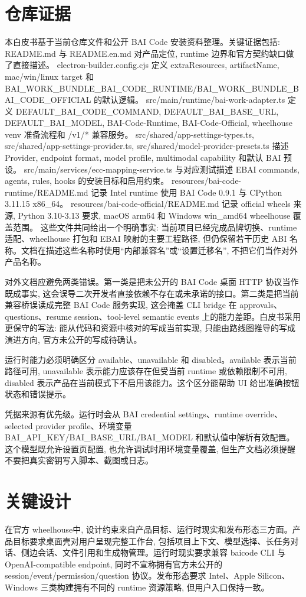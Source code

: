 \section{仓库证据}
本白皮书基于当前仓库文件和公开 BAI Code 安装资料整理。关键证据包括: README.md 与 README.en.md 对产品定位, runtime 边界和官方契约缺口做了直接描述。 electron-builder.config.cjs 定义 extraResources, artifactName, mac/win/linux target 和 BAI\_WORK\_BUNDLE\_BAI\_CODE\_RUNTIME/BAI\_WORK\_BUNDLE\_BAI\_CODE\_OFFICIAL 的默认逻辑。 src/main/runtime/bai-work-adapter.ts 定义 DEFAULT\_BAI\_CODE\_COMMAND, DEFAULT\_BAI\_BASE\_URL, DEFAULT\_BAI\_MODEL, BAI-Code-Runtime, BAI-Code-Official, wheelhouse venv 准备流程和 /v1/* 兼容服务。 src/shared/app-settings-types.ts, src/shared/app-settings-provider.ts, src/shared/model-provider-presets.ts 描述 Provider, endpoint format, model profile, multimodal capability 和默认 BAI 预设。 src/main/services/ecc-mapping-service.ts 与对应测试描述 EBAI commands, agents, rules, hooks 的安装目标和启用约束。 resources/bai-code-runtime/README.md 记录 Intel runtime 使用 BAI Code 0.9.1 与 CPython 3.11.15 x86\_64。 resources/bai-code-official/README.md 记录 official wheels 来源, Python 3.10-3.13 要求, macOS arm64 和 Windows win\_amd64 wheelhouse 覆盖范围。 这些文件共同给出一个明确事实: 当前项目已经完成品牌切换、runtime 适配、wheelhouse 打包和 EBAI 映射的主要工程路径, 但仍保留若干历史 ABI 名称。文档在描述这些名称时使用“内部兼容名”或“设置迁移名”, 不把它们当作对外产品名称。

对外文档应避免两类错误。第一类是把未公开的 BAI Code 桌面 HTTP 协议当作既成事实, 这会误导二次开发者直接依赖不存在或未承诺的接口。第二类是把当前兼容桥误读成完整 BAI Code 服务实现, 这会掩盖 CLI bridge 在 approvals、questions、resume session、tool-level semantic events 上的能力差距。白皮书采用更保守的写法: 能从代码和资源中核对的写成当前实现, 只能由路线图推导的写成演进方向, 官方未公开的写成待确认。

运行时能力必须明确区分 available、unavailable 和 disabled。available 表示当前路径可用, unavailable 表示能力应该存在但受当前 runtime 或依赖限制不可用, disabled 表示产品在当前模式下不启用该能力。这个区分能帮助 UI 给出准确按钮状态和错误提示。

凭据来源有优先级。运行时会从 BAI credential settings、runtime override、selected provider profile、环境变量 BAI\_API\_KEY/BAI\_BASE\_URL/BAI\_MODEL 和默认值中解析有效配置。这个模型既允许设置页配置, 也允许调试时用环境变量覆盖, 但生产文档必须提醒不要把真实密钥写入脚本、截图或日志。

\section{关键设计}
在官方 wheelhouse中, 设计约束来自产品目标、运行时现实和发布形态三方面。产品目标要求桌面壳对用户呈现完整工作台, 包括项目上下文、模型选择、长任务对话、侧边会话、文件引用和生成物管理。运行时现实要求兼容 baicode CLI 与 OpenAI-compatible endpoint, 同时不宣称拥有官方未公开的 session/event/permission/question 协议。发布形态要求 Intel、Apple Silicon、Windows 三类构建拥有不同的 runtime 资源策略, 但用户入口保持一致。

